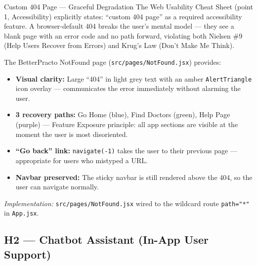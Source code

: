 \documentclass[12pt, a4paper]{article}
\begin{document}
\begin{featurebox}{Custom 404 Page --- Graceful Degradation}
The Web Usability Cheat Sheet (point 1, Accessibility) explicitly states: ``custom 404 page'' as a required accessibility feature. A browser-default 404 breaks the user's mental model --- they see a blank page with an error code and no path forward, violating both Nielsen \#9 (Help Users Recover from Errors) and Krug's Law (Don't Make Me Think).

The BetterPracto NotFound page (\texttt{src/pages/NotFound.jsx}) provides:
\begin{itemize}[leftmargin=1.5em, itemsep=0pt]
  \item \textbf{Visual clarity:} Large ``404'' in light grey text with an amber {\texttt{AlertTriangle}} icon overlay --- communicates the error immediately without alarming the user.
  \item \textbf{3 recovery paths:} Go Home (blue), Find Doctors (green), Help Page (purple) --- Feature Exposure principle: all app sections are visible at the moment the user is most disoriented.
  \item \textbf{``Go back'' link:} \texttt{navigate(-1)} takes the user to their previous page --- appropriate for users who mistyped a URL.
  \item \textbf{Navbar preserved:} The sticky navbar is still rendered above the 404, so the user can navigate normally.
\end{itemize}

\textit{Implementation:} \texttt{src/pages/NotFound.jsx} wired to the wildcard route \texttt{path="*"} in \texttt{App.jsx}.
\end{featurebox}

\subsection{H2 --- Chatbot Assistant (In-App User Support)}
\end{document}
